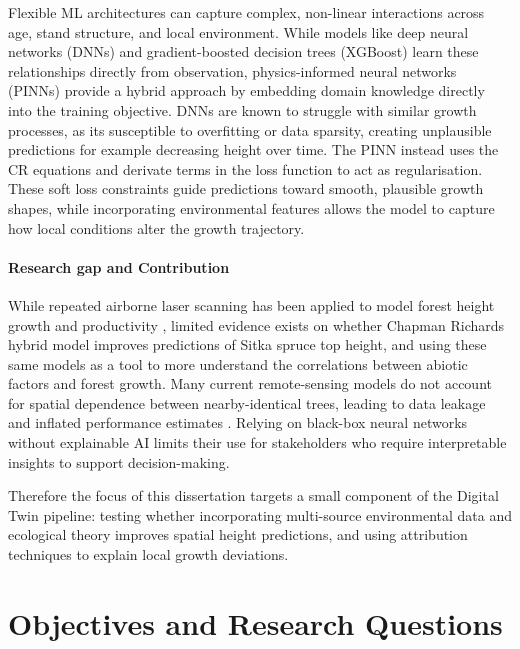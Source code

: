 \documentclass[logo,msc,ai]{infthesis}           %
\begin{document}
Flexible ML architectures can capture complex, non-linear interactions across age, stand structure, and local environment. While models like deep neural networks (DNNs) and gradient-boosted decision trees (XGBoost) learn these relationships directly from observation, physics-informed neural networks (PINNs) provide a hybrid approach by embedding domain knowledge directly into the training objective. DNNs are known to struggle with similar growth processes, as its susceptible to overfitting or data sparsity, creating unplausible predictions for example decreasing height over time. The PINN instead uses the CR equations and derivate terms in the loss function to act as regularisation. These soft loss constraints guide predictions toward smooth, plausible growth shapes, while incorporating environmental features allows the model to capture how local conditions alter the growth trajectory. \cite{karpatne2017Theory_C4_NN, pichler2025Inferring_C4_NN}

\paragraph*{Research gap and Contribution}
While repeated airborne laser scanning has been applied to model forest height growth and productivity \cite{janiec2023Development_C1_SS}, limited evidence exists on whether Chapman Richards hybrid model improves predictions of Sitka spruce top height, and using these same models as a tool to more understand the correlations between abiotic factors and forest growth. Many current remote-sensing models do not account for spatial dependence between nearby-identical trees, leading to data leakage and inflated performance estimates \cite{Karasiak2022Spatial_C5_EVAL, ploton2020Spatial_C5_EVAL, lynch2025Digital_C4_NN}. Relying on black-box neural networks without explainable AI limits their use for stakeholders who require interpretable insights to support decision-making.

Therefore the focus of this dissertation targets a small component of the Digital Twin pipeline: testing whether incorporating multi-source environmental data and ecological theory improves spatial height predictions, and using attribution techniques to explain local growth deviations.

\vspace{5 em}
\vspace{-0.5em}

\section{Objectives and Research Questions}
\end{document}
